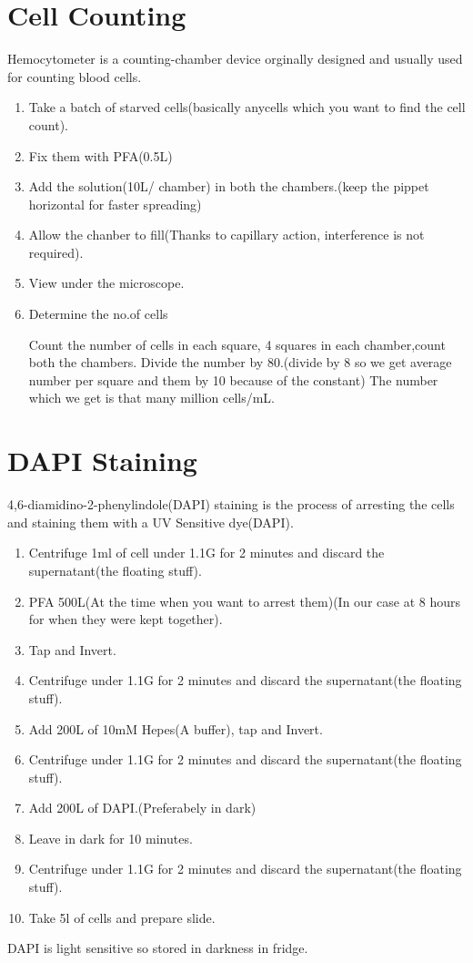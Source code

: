 \documentclass[11pt,twoside,a4paper]{article}
\begin{document}
\section{Cell Counting}
Hemocytometer is a counting-chamber device orginally designed and usually used for counting blood cells.
\begin{enumerate}
	\item Take a batch of starved cells(basically anycells which you want to find the cell count).
	\item Fix them with PFA(0.5\textmu{}L)
	\item Add the solution(10\textmu{}L/ chamber) in both the chambers.(keep the pippet horizontal for faster spreading)
	\item Allow the chanber to fill(Thanks to capillary action, interference is not required).
	\item View under the microscope.
	\item Determine the no.of cells

		Count the number of cells in each square, 4 squares in each chamber,count both the chambers.
		Divide the number by 80.(divide by 8 so we get average number per square and them by 10 because of the constant)
		The number which we get is that many million cells/mL.
\end{enumerate}

\section{DAPI Staining}
 4,6-diamidino-2-phenylindole(DAPI) staining is the process of arresting the cells and staining them with a UV Sensitive dye(DAPI).
\begin{enumerate}
	\item Centrifuge 1ml of cell under 1.1G for 2 minutes and discard the supernatant(the floating stuff).
	\item PFA 500\textmu{}L(At the time when you want to arrest them)(In our case at 8 hours for when they were kept together).
	\item Tap and Invert.
	\item Centrifuge under 1.1G for 2 minutes and discard the supernatant(the floating stuff).
	\item Add 200\textmu{}L of 10mM Hepes(A buffer), tap and Invert.
	\item Centrifuge under 1.1G for 2 minutes and discard the supernatant(the floating stuff).
	\item Add 200\textmu{}L of DAPI.(Preferabely in dark)
	\item Leave in dark for 10 minutes.
	\item Centrifuge under 1.1G for 2 minutes and discard the supernatant(the floating stuff).
	\item Take 5\textmu{}l of cells and prepare slide.
\end{enumerate}
DAPI is light sensitive so stored in darkness in fridge.
\end{document}
